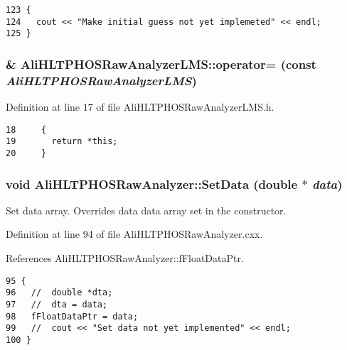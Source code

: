 \footnotesize\begin{verbatim}123 {
124   cout << "Make initial guess not yet implemeted" << endl;
125 }
\end{verbatim}\normalsize 


\subsubsection{\& Ali\-HLTPHOSRaw\-Analyzer\-LMS::operator= (const  {\em Ali\-HLTPHOSRaw\-Analyzer\-LMS})\hspace{0.3cm}{\tt  [inline]}}\label{classAliHLTPHOSRawAnalyzerLMS_AliHLTPHOSRawAnalyzerLMSa3}




Definition at line 17 of file Ali\-HLTPHOSRaw\-Analyzer\-LMS.h.

\footnotesize\begin{verbatim}18     {
19       return *this; 
20     }
\end{verbatim}\normalsize 


\subsubsection{\setlength{\rightskip}{0pt plus 5cm}void Ali\-HLTPHOSRaw\-Analyzer::Set\-Data (double $\ast$ {\em data})\hspace{0.3cm}{\tt  [inherited]}}\label{classAliHLTPHOSRawAnalyzer_AliHLTPHOSRawAnalyzerPeakFindera12}


Set data array. Overrides data data array set in the constructor. 

Definition at line 94 of file Ali\-HLTPHOSRaw\-Analyzer.cxx.

References Ali\-HLTPHOSRaw\-Analyzer::f\-Float\-Data\-Ptr.

\footnotesize\begin{verbatim}95 {
96   //  double *dta;
97   //  dta = data;
98   fFloatDataPtr = data;
99   //  cout << "Set data not yet implemented" << endl;
100 }
\end{verbatim}\normalsize 


